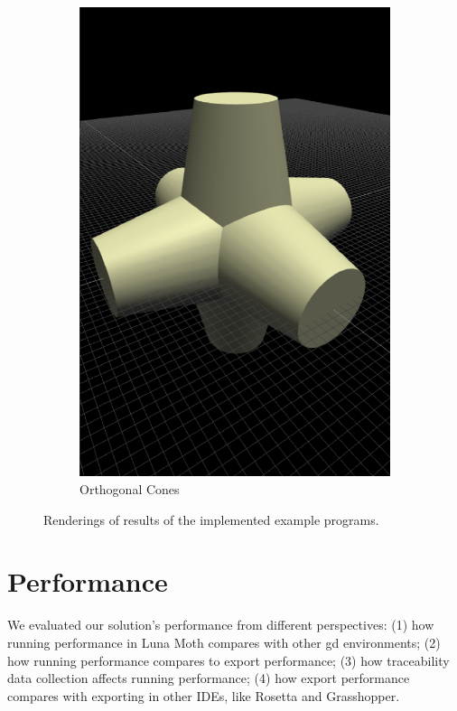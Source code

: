 \begin{figure}
\begin{subfigure}[b]{0.32\linewidth}
    \includegraphics[width=1.0\linewidth]{./images/all_examples/ortho_cones_crop}
    \caption{Orthogonal Cones}
    \label{fig:ex:ortho:cones}
  \end{subfigure}

  \caption{Renderings of results of the implemented example programs.}
  \label{fig:all:examples}
\end{figure}


\section{Performance}
\label{sec:eval:performance}
We evaluated our solution's performance from different perspectives:
(1) how running performance in Luna Moth compares with other \gls{gd} environments;
(2) how running performance compares to export performance;
(3) how traceability data collection affects running performance;
(4) how export performance compares with exporting in other IDEs, like Rosetta and Grasshopper.

